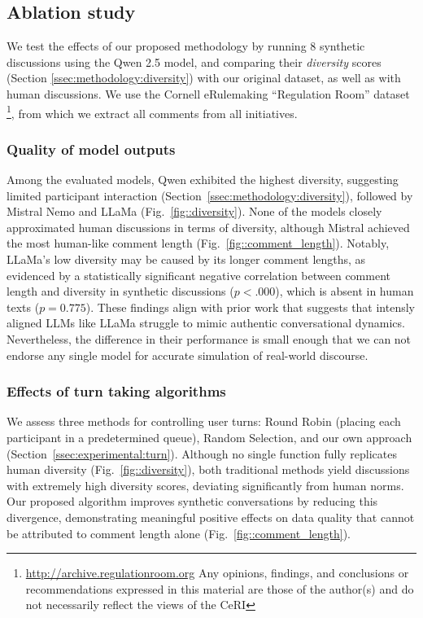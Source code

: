 \subsection{Ablation study}
\label{ssec:results:ablation}

We test the effects of our proposed methodology by running $8$ synthetic discussions using the Qwen 2.5 model, and comparing their \textit{diversity} scores (Section \ref{ssec:methodology:diversity}) with our original dataset, as well as with human discussions. We use the Cornell eRulemaking “Regulation Room” dataset \footnote{\url{http://archive.regulationroom.org} Any opinions, findings, and conclusions or recommendations expressed in this material are those of the author(s) and do not necessarily reflect the views of the \ac{CeRI}}, from which we extract all comments from all initiatives. 


\subsubsection{Quality of model outputs}

Among the evaluated models, Qwen exhibited the highest diversity, suggesting limited participant interaction (Section~\ref{ssec:methodology:diversity}), followed by Mistral Nemo and LLaMa (Fig.~\ref{fig::diversity}). None of the models closely approximated human discussions in terms of diversity, although Mistral achieved the most human-like comment length (Fig.~\ref{fig::comment_length}). Notably, LLaMa's low diversity may be caused by its longer comment lengths, as evidenced by a statistically significant negative correlation between comment length and diversity in synthetic discussions ($p<.000$), which is absent in human texts ($p=0.775$). These findings align with prior work \cite{Park2023GenerativeAI, leng_2024} that suggests that intensly aligned \acp{LLM} like LLaMa struggle to mimic authentic conversational dynamics. Nevertheless, the difference in their performance is small enough that we can not endorse any single model for accurate simulation of real-world discourse.


\subsubsection{Effects of turn taking algorithms}

We assess three methods for controlling user turns: Round Robin (placing each participant in a predetermined queue), Random Selection, and our own approach (Section~\ref{ssec:experimental:turn}). Although no single function fully replicates human diversity (Fig.~\ref{fig::diversity}), both traditional methods yield discussions with extremely high diversity scores, deviating significantly from human norms. Our proposed algorithm improves synthetic conversations by reducing this divergence, demonstrating meaningful positive effects on data quality that cannot be attributed to comment length alone (Fig.~\ref{fig::comment_length}).


